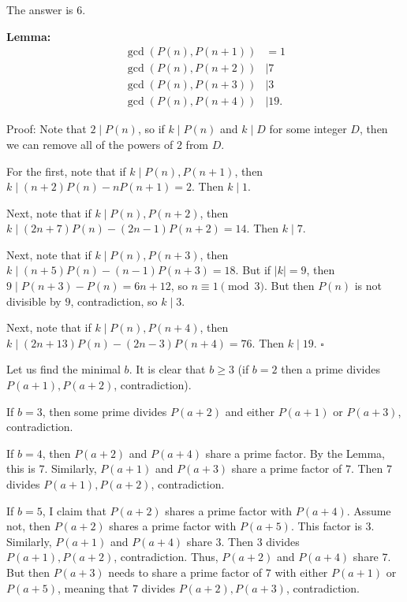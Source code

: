The answer is $6$.

\textbf{Lemma:} \begin{align*}\gcd\left(P\left(n\right),P\left(n+1\right)\right)&=1\\\gcd\left(P\left(n\right),P\left(n+2\right)\right)&\mid7\\\gcd\left(P\left(n\right),P\left(n+3\right)\right)&\mid3\\\gcd\left(P\left(n\right),P\left(n+4\right)\right)&\mid19.\end{align*}

Proof: Note that $2\mid P\left(n\right)$, so if $k\mid P\left(n\right)$ and $k\mid D$ for some integer $D$, then we can remove all of the powers of $2$ from $D$.

For the first, note that if $k\mid P\left(n\right),P\left(n+1\right)$, then $k\mid\left(n+2\right)P\left(n\right)-nP\left(n+1\right)=2$. Then $k\mid1$.

Next, note that if $k\mid P\left(n\right),P\left(n+2\right)$, then $k\mid\left(2n+7\right)P\left(n\right)-\left(2n-1\right)P\left(n+2\right)=14$. Then $k\mid7$.

Next, note that if $k\mid P\left(n\right),P\left(n+3\right)$, then $k\mid\left(n+5\right)P\left(n\right)-\left(n-1\right)P\left(n+3\right)=18$. But if $\left|k\right|=9$, then $9\mid P\left(n+3\right)-P\left(n\right)=6n+12$, so $n\equiv1\pmod3$. But then $P\left(n\right)$ is not divisible by $9$, contradiction, so $k\mid3$.

Next, note that if $k\mid P\left(n\right),P\left(n+4\right)$, then $k\mid\left(2n+13\right)P\left(n\right)-\left(2n-3\right)P\left(n+4\right)=76$. Then $k\mid19$. $\square$

Let us find the minimal $b$. It is clear that $b\geq3$ (if $b=2$ then a prime divides $P\left(a+1\right),P\left(a+2\right)$, contradiction).

If $b=3$, then some prime divides $P\left(a+2\right)$ and either $P\left(a+1\right)$ or $P\left(a+3\right)$, contradiction.

If $b=4$, then $P\left(a+2\right)$ and $P\left(a+4\right)$ share a prime factor. By the Lemma, this is $7$. Similarly, $P\left(a+1\right)$ and $P\left(a+3\right)$ share a prime factor of $7$. Then $7$ divides $P\left(a+1\right),P\left(a+2\right)$, contradiction.

If $b=5$, I claim that $P\left(a+2\right)$ shares a prime factor with $P\left(a+4\right)$. Assume not, then $P\left(a+2\right)$ shares a prime factor with $P\left(a+5\right)$. This factor is $3$. Similarly, $P\left(a+1\right)$ and $P\left(a+4\right)$ share $3$. Then $3$ divides $P\left(a+1\right),P\left(a+2\right)$, contradiction. Thus, $P\left(a+2\right)$ and $P\left(a+4\right)$ share $7$. But then $P\left(a+3\right)$ needs to share a prime factor of $7$ with either $P\left(a+1\right)$ or $P\left(a+5\right)$, meaning that $7$ divides $P\left(a+2\right),P\left(a+3\right)$, contradiction.

